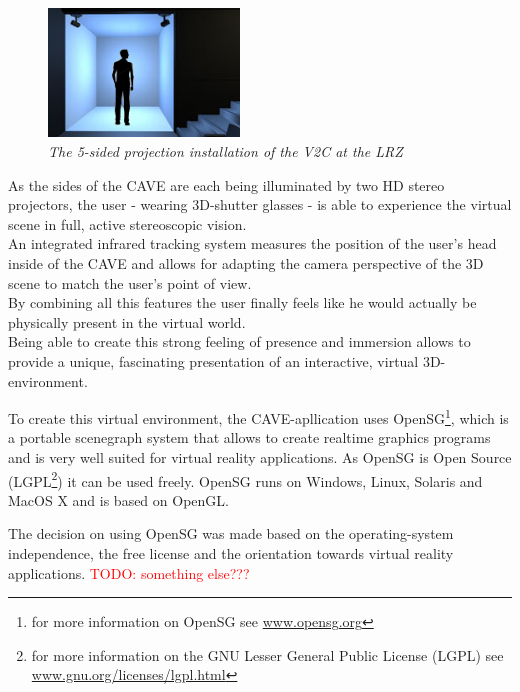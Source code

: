 \documentclass[conference]{acmsiggraph}
\newcommand{\todo}[1]{\textcolor{red}{TODO: #1}}
\begin{document}
\begin{figure}[htb]
  \centering
  \includegraphics[width=2.0in]{5_sided_cave}
  \caption[The 5-sided projection installation, source: \newline\href{http://www.lrz.de/services/v2c\_ de/bilder/5sided.jpg}{http://www.lrz.de/services/v2c\_de/bilder/5sided.jpg}]{\textit{The 5-sided projection installation of the V2C at the LRZ}}
  \label{fig:5sided}
\end{figure}

As the sides of the CAVE are each being illuminated by two HD stereo projectors, the user - wearing 3D-shutter glasses - is able to experience the virtual scene in full, active stereoscopic vision.\\
An integrated infrared tracking system measures the position of the user's head inside of the CAVE and allows for adapting the camera perspective of the 3D scene to match the user's point of view.\\
By combining all this features the user finally feels like he would actually be physically present in the virtual world.\\
Being able to create this strong feeling of presence and immersion allows to provide a unique, fascinating presentation of an interactive, virtual 3D-environment.

To create this virtual environment, the CAVE-apllication uses OpenSG\footnote{for more information on OpenSG see \href{http://www.opensg.org/}{www.opensg.org}}, which is a portable scenegraph system that allows to create realtime graphics programs and is very well suited for virtual reality applications. As OpenSG is Open Source (LGPL\footnote{for more information on the GNU Lesser General Public License (LGPL) see \href{https://www.gnu.org/licenses/lgpl.html}{www.gnu.org/licenses/lgpl.html}}) it can be used freely. OpenSG runs on Windows, Linux, Solaris and MacOS X and is based on OpenGL.

The decision on using OpenSG was made based on the operating-system independence, the free license and the orientation towards virtual reality applications. \todo{something else???}
\end{document}

